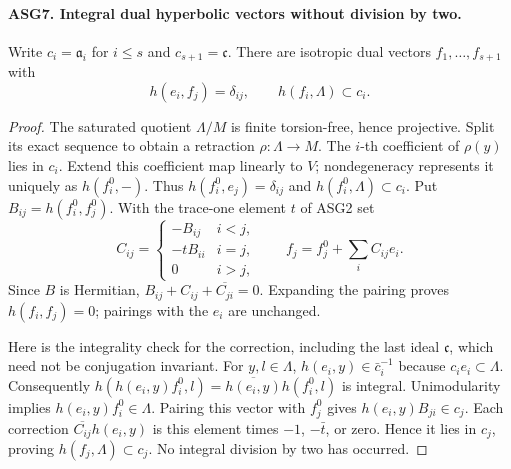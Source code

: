 \paragraph{ASG7. Integral dual hyperbolic vectors without division by two.}
\label{claim:ASG7}
Write \(c_i=\mathfrak a_i\) for \(i\le s\) and
\(c_{s+1}=\mathfrak c\).  There are isotropic dual vectors
\(f_1,\ldots,f_{s+1}\) with
\[
       h(e_i,f_j)=\delta_{ij},\qquad h(f_i,\Lambda)\subset c_i.
\tag{ASG.7}
\]
\begin{proof}
The saturated quotient \(\Lambda/M\) is finite torsion-free,
hence projective.  Split its exact sequence to obtain a retraction
\(\rho:\Lambda\to M\).  The \(i\)-th coefficient of
\(\rho(y)\) lies in \(c_i\).  Extend this coefficient map
linearly to \(V\); nondegeneracy represents it uniquely as
\(h(f_i^0,-)\).  Thus
\(h(f_i^0,e_j)=\delta_{ij}\) and
\(h(f_i^0,\Lambda)\subset c_i\).
Put \(B_{ij}=h(f_i^0,f_j^0)\).  With the trace-one element
\(t\) of ASG2 set
\[
 C_{ij}=\begin{cases}-B_{ij}&i<j,\\-tB_{ii}&i=j,\\0&i>j,
              \end{cases}
 \qquad f_j=f_j^0+\sum_i C_{ij}e_i.
\tag{ASG.8}
\]
Since \(B\) is Hermitian,
\(B_{ij}+C_{ij}+\overline{C_{ji}}=0\).
Expanding the pairing proves \(h(f_i,f_j)=0\); pairings with
the \(e_i\) are unchanged.

Here is the integrality check for the correction, including the last
ideal \(\mathfrak c\), which need not be conjugation invariant.
For \(y,l\in\Lambda\),
\(h(e_i,y)\in\bar c_i^{-1}\) because \(c_i e_i\subset\Lambda\).
Consequently
\(h(h(e_i,y)f_i^0,l)=\overline{h(e_i,y)}h(f_i^0,l)\)
is integral.  Unimodularity implies
\(h(e_i,y)f_i^0\in\Lambda\).  Pairing this vector with
\(f_j^0\) gives \(h(e_i,y)B_{ji}\in c_j\).
Each correction \(\overline{C_{ij}}h(e_i,y)\) is this element
times \(-1\), \(-\bar t\), or zero.  Hence it lies in
\(c_j\), proving \(h(f_j,\Lambda)\subset c_j\).
No integral division by two has occurred.
\end{proof}

